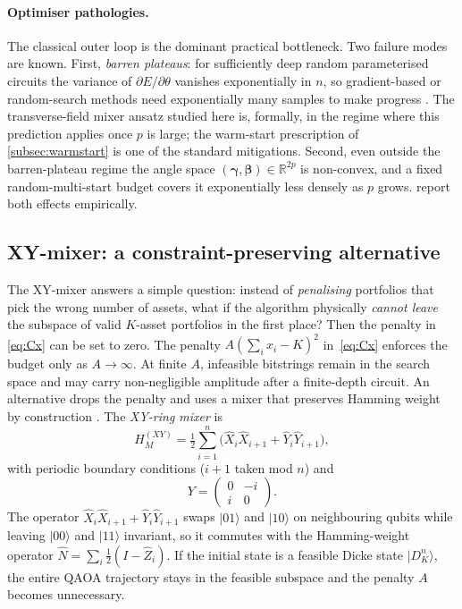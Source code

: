 \paragraph{Optimiser pathologies.}
The classical outer loop is the dominant practical bottleneck. Two failure modes are known. First, \emph{barren plateaus}: for sufficiently deep random parameterised circuits the variance of $\partial E / \partial\theta$ vanishes exponentially in $n$, so gradient-based or random-search methods need exponentially many samples to make progress \autocite{mcclean2018barren}. The transverse-field mixer ansatz studied here is, formally, in the regime where this prediction applies once $p$ is large; the warm-start prescription of \cref{subsec:warmstart} is one of the standard mitigations. Second, even outside the barren-plateau regime the angle space $(\boldsymbol\gamma, \boldsymbol\beta) \in \mathbb{R}^{2p}$ is non-convex, and a fixed random-multi-start budget covers it exponentially less densely as $p$ grows.  report both effects empirically.


\subsection{XY-mixer: a constraint-preserving alternative}\label{subsec:xymixer}

The XY-mixer answers a simple question: instead of \emph{penalising} portfolios that pick the wrong number of assets, what if the algorithm physically \emph{cannot leave} the subspace of valid $K$-asset portfolios in the first place? Then the penalty in \eqref{eq:Cx} can be set to zero. The penalty $A(\sum_i x_i - K)^2$ in~\eqref{eq:Cx} enforces the budget only as $A \to \infty$. At finite $A$, infeasible bitstrings remain in the search space and may carry non-negligible amplitude after a finite-depth circuit. An alternative drops the penalty and uses a mixer that preserves Hamming weight by construction \autocite{mancilla2026constrained}. The \emph{XY-ring mixer} is
\begin{equation}\label{eq:HM-XY}
    H_M^{(XY)} = \tfrac{1}{2} \sum_{i=1}^{n} \bigl( \hat{X}_i \hat{X}_{i+1} + \hat{Y}_i \hat{Y}_{i+1} \bigr),
\end{equation}
with periodic boundary conditions ($i + 1$ taken mod $n$) and
\begin{equation}
    Y = \begin{pmatrix} 0 & -i \\ i & 0 \end{pmatrix}.
\end{equation}
The operator $\hat{X}_i \hat{X}_{i+1} + \hat{Y}_i \hat{Y}_{i+1}$ swaps $|01\rangle$ and $|10\rangle$ on neighbouring qubits while leaving $|00\rangle$ and $|11\rangle$ invariant, so it commutes with the Hamming-weight operator $\hat{N} = \sum_i \tfrac{1}{2}(I - \hat{Z}_i)$. If the initial state is a feasible Dicke state $|D^n_K\rangle$, the entire QAOA trajectory stays in the feasible subspace and the penalty $A$ becomes unnecessary.


